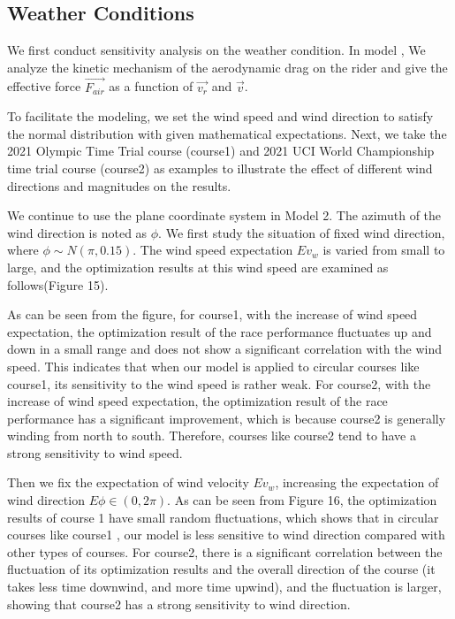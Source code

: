 \documentclass{mcmthesis}
\begin{document}
\subsection{Weather Conditions}
We first conduct sensitivity analysis on the weather condition. In model \uppercase\expandafter{}, We analyze the kinetic mechanism of the aerodynamic drag on the rider and give the effective force $\vec{F_{air}}$ as a function of $\vec{v_r}$ and $\vec{v}$.

To facilitate the modeling, we set the wind speed and wind direction to satisfy the normal distribution with given mathematical expectations. Next, we take the 2021 Olympic Time Trial course (course1) and 2021 UCI World Championship time trial course (course2) as examples to illustrate the effect of different wind directions and magnitudes on the results.

We continue to use the plane coordinate system in Model 2. The azimuth of the wind direction is noted as $\phi$. We first study the situation of fixed wind direction, where $\phi \sim{N(\pi,0.15)}$. The wind speed expectation $Ev_w$ is varied from small to large, and the optimization results at this wind speed are examined as follows(Figure 15).
 \begin{figure}[h]
	\centering
	\caption{}
\end{figure}


As can be seen from the figure, for course1, with the increase of wind speed expectation, the optimization result of the race performance fluctuates up and down in a small range and does not show a significant correlation with the wind speed. This indicates that when our model is applied to circular courses like course1, its sensitivity to the wind speed is rather weak. For course2, with the increase of wind speed expectation, the optimization result of the race performance has a significant improvement, which is because course2 is generally winding from north to south. Therefore, courses like course2 tend to have a strong sensitivity to wind speed.




Then we fix the expectation of wind velocity $Ev_w$, increasing the expectation of wind direction $E\phi\in(0,2\pi)$. As can be seen from Figure 16, the optimization results of course 1 have small random fluctuations, which shows that in circular courses like course1 , our model is less sensitive to wind direction compared with other types of courses. For course2, there is a significant correlation between the fluctuation of its optimization results and the overall direction of the course (it takes less time downwind, and more time upwind), and the fluctuation is larger, showing that course2 has a strong sensitivity to wind direction.
\end{document}
